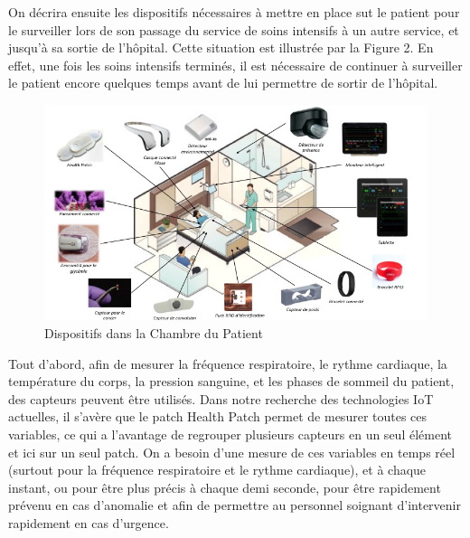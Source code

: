 \documentclass{article}
\begin{document}
On décrira ensuite les dispositifs nécessaires à mettre en place sut le patient pour le surveiller lors de son passage du service de soins intensifs à un autre service, et jusqu’à sa sortie de l’hôpital. Cette situation est illustrée par la Figure 2. En effet, une fois les soins intensifs terminés, il est nécessaire de continuer à surveiller le patient encore quelques temps avant de lui permettre de sortir de l’hôpital.
\\
\begin{figure}[h!]
	\hspace*{-1cm}
	\centering
	\includegraphics[width=1.2\textwidth]{Figure1.jpg}
	\caption{Dispositifs dans la Chambre du Patient}
	\label{fig:balance}
\end{figure}


Tout d’abord, afin de mesurer la fréquence respiratoire, le rythme cardiaque, la température du corps, la pression sanguine, et les phases de sommeil du patient, des capteurs peuvent être utilisés. Dans notre recherche des technologies IoT actuelles, il s’avère que le patch Health Patch \cite{HealthPatch} permet de mesurer toutes ces variables, ce qui a l’avantage de regrouper plusieurs capteurs en un seul élément  et ici sur un seul patch. On a besoin d’une mesure de ces variables en temps réel (surtout pour la fréquence respiratoire et le rythme cardiaque), et à chaque instant, ou pour être plus précis à chaque demi seconde, pour être rapidement prévenu en cas d’anomalie et afin de permettre au personnel soignant d’intervenir rapidement en cas d’urgence.
\end{document}

